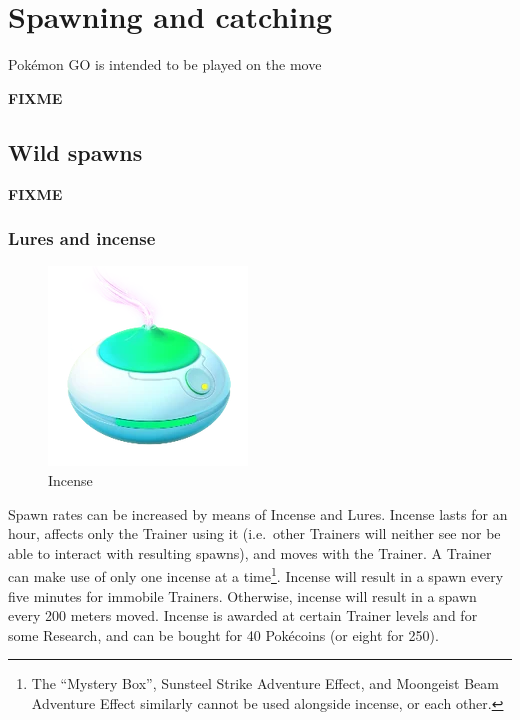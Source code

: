 \chapter{Spawning and catching}
Pokémon GO is intended to be played on the move

\label{chap:spawn}
\textbf{FIXME}

\section{Wild spawns}
\label{sec:spawns}
\textbf{FIXME}

\subsection{Lures and incense}
\begin{figure}
  \center
  \includegraphics[scale=.5]{images/incense.png}
  \caption*{Incense}
\end{figure}
Spawn rates can be increased by means of Incense and Lures.
Incense lasts for an hour, affects only the Trainer using it (i.e.\ other Trainers
  will neither see nor be able to interact with resulting spawns),
  and moves with the Trainer.
A Trainer can make use of only one incense at a time\footnote{The
  ``Mystery Box'', Sunsteel Strike Adventure Effect, and
  Moongeist Beam Adventure Effect similarly cannot be used
  alongside incense, or each other.}.
Incense will result in a spawn every five minutes for immobile Trainers.
Otherwise, incense will result in a spawn every 200 meters moved.
Incense is awarded at certain Trainer levels and for some Research,
  and can be bought for 40 Pokécoins (or eight for 250).

